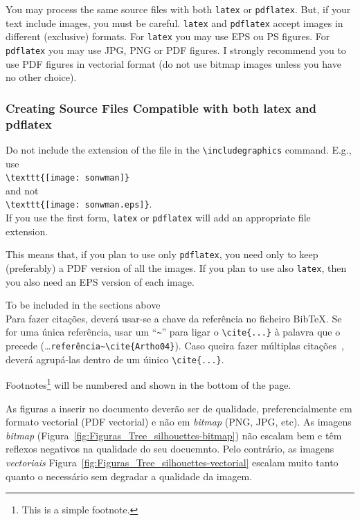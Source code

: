 You may process the same source files with both \verb!latex! or \verb!pdflatex!. But, if your text include images, you must be careful. \verb!latex! and \verb!pdflatex! accept images in different (exclusive) formats.  For \verb!latex! you may use EPS ou PS figures. For \verb!pdflatex! you may use JPG, PNG or PDF figures.  I strongly recommend you to use PDF figures in vectorial format (do not use bitmap images unless you have no other choice).


\subsubsection{Creating Source Files Compatible with both latex and pdflatex} %
\label{ssec:creating_source_files_compatible_with_both_latex_and_pdflatex}

Do not include the extension of the file in the \verb!\includegraphics! command. E.g., use\\
\verb!\texttt{[image: sonwman]}!\\
and not\\
\verb!\texttt{[image: sonwman.eps]}!.\\
If you use the first form, \verb!latex! or \verb!pdflatex! will add an appropriate file extension.

This means that, if you plan to use only \verb!pdflatex!, you need only to keep (preferably) a PDF version of all the images. If you plan to use also \verb!latex!, then you also need an EPS version of each image.



\newpage

{\Large To be included in the sections above}\\

Para fazer citações, deverá usar-se a chave da referência no ficheiro BibTeX. Se for uma única referência, usar um ``\verb!~!'' para ligar o \verb!\cite{...}! à palavra que o precede (\ldots\verb!referência~\cite{Artho04}!).  Caso queira fazer múltiplas citações~\cite{Shavit95,Silberschatz06,Moss85}, deverá agrupá-las dentro de um úinico \verb!\cite{...}!.



Footnotes\footnote{This is a simple footnote.} will be numbered and shown in the bottom of the page.



As figuras a inserir no documento deverão ser de qualidade, preferencialmente em formato vectorial (PDF vectorial) e não em \emph{bitmap} (PNG, JPG, etc). As imagens \emph{bitmap} (Figura~\ref{fig:Figuras_Tree_silhouettes-bitmap}) não escalam bem e têm reflexos negativos na qualidade do seu docuemnto.  Pelo contrário, as imagens \emph{vectoriais} {Figura~\ref{fig:Figuras_Tree_silhouettes-vectorial}} escalam muito tanto quanto o necessário sem degradar a qualidade da imagem.

